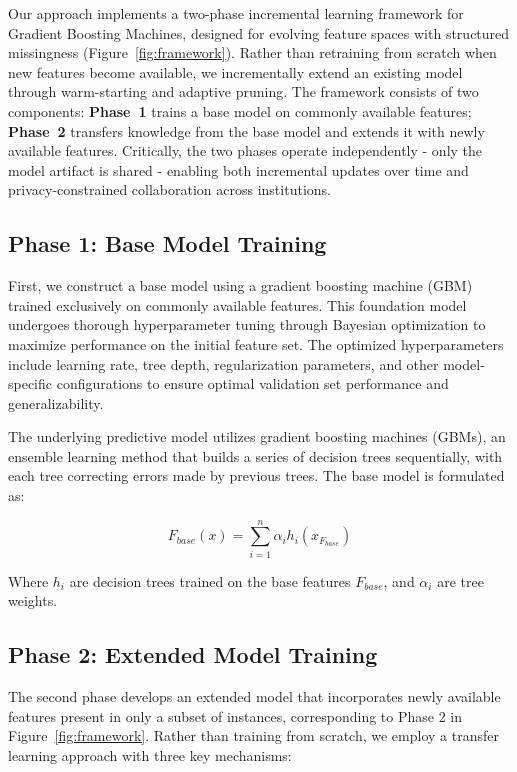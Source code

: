 \documentclass[sigconf]{acmart}
\begin{document}
\begin{itemize}
Our approach implements a two-phase incremental learning framework for Gradient Boosting Machines, designed for evolving feature spaces with structured missingness (Figure~\ref{fig:framework}). Rather than retraining from scratch when new features become available, we incrementally extend an existing model through warm-starting and adaptive pruning. The framework consists of two components: \textbf{Phase~1} trains a base model on commonly available features; \textbf{Phase~2} transfers knowledge from the base model and extends it with newly available features. Critically, the two phases operate independently - only the model artifact is shared - enabling both incremental updates over time and privacy-constrained collaboration across institutions.

\subsection{Phase 1: Base Model Training}

First, we construct a base model using a gradient boosting machine (GBM) trained exclusively on commonly available features. This foundation model undergoes thorough hyperparameter tuning through Bayesian optimization to maximize performance on the initial feature set. The optimized hyperparameters include learning rate, tree depth, regularization parameters, and other model-specific configurations to ensure optimal validation set performance and generalizability.

The underlying predictive model utilizes gradient boosting machines (GBMs), an ensemble learning method that builds a series of decision trees sequentially, with each tree correcting errors made by previous trees. The base model is formulated as:

\begin{equation}
F_{base}(x) = \sum_{i=1}^{n} \alpha_i h_i(x_{F_{base}})
\end{equation}

Where $h_i$ are decision trees trained on the base features $F_{base}$, and $\alpha_i$ are tree weights.

\subsection{Phase 2: Extended Model Training}

The second phase develops an extended model that incorporates newly available features present in only a subset of instances, corresponding to Phase 2 in Figure~\ref{fig:framework}. Rather than training from scratch, we employ a transfer learning approach with three key mechanisms:


\end{itemize}
\end{document}
